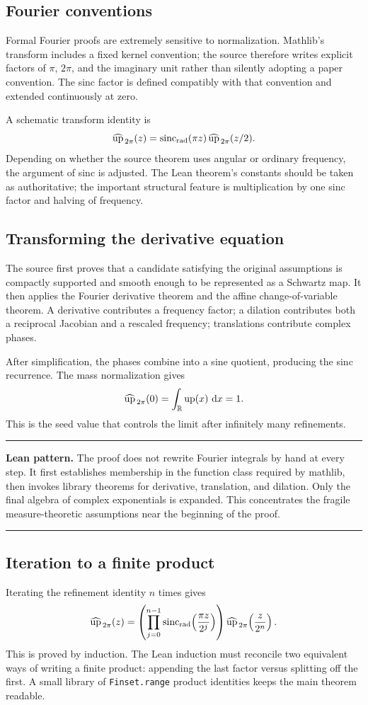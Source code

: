 \documentclass[11pt,oneside]{article}
\theoremstyle{definition}
\theoremstyle{remark}
\newenvironment{boxedremark}{%
  \par\smallskip\noindent\begin{center}\begin{minipage}{0.94\textwidth}%
  \color{black}\hrule\vspace{0.6em}\small
}{%
  \vspace{0.6em}\hrule\end{minipage}\end{center}\smallskip
}
\begin{document}
\subsection{Fourier conventions}
Formal Fourier proofs are extremely sensitive to normalization.  Mathlib's transform includes a fixed kernel convention; the source therefore writes explicit factors of \(\pi\), \(2\pi\), and the imaginary unit rather than silently adopting a paper convention.  The sinc factor is defined compatibly with that convention and extended continuously at zero.

A schematic transform identity is
\[
  \widehat{\operatorname{up}}_{\,2\pi}(z)
  =\operatorname{sinc}_{\mathrm{rad}}(\pi z)\,
   \widehat{\operatorname{up}}_{\,2\pi}(z/2).
\]
Depending on whether the source theorem uses angular or ordinary frequency, the argument of sinc is adjusted.  The Lean theorem's constants should be taken as authoritative; the important structural feature is multiplication by one sinc factor and halving of frequency.

\subsection{Transforming the derivative equation}
The source first proves that a candidate satisfying the original assumptions is compactly supported and smooth enough to be represented as a Schwartz map.  It then applies the Fourier derivative theorem and the affine change-of-variable theorem.  A derivative contributes a frequency factor; a dilation contributes both a reciprocal Jacobian and a rescaled frequency; translations contribute complex phases.

After simplification, the phases combine into a sine quotient, producing the sinc recurrence.  The mass normalization gives
\[
  \widehat{\operatorname{up}}_{\,2\pi}(0)=\int_{\mathbb{R}}\operatorname{up}(x)\,\mathop{}\!\mathrm{d} x=1.
\]
This is the seed value that controls the limit after infinitely many refinements.

\begin{boxedremark}\textbf{Lean pattern.}\space
The proof does not rewrite Fourier integrals by hand at every step.  It first establishes membership in the function class required by mathlib, then invokes library theorems for derivative, translation, and dilation.  Only the final algebra of complex exponentials is expanded.  This concentrates the fragile measure-theoretic assumptions near the beginning of the proof.
\end{boxedremark}

\subsection{Iteration to a finite product}
Iterating the refinement identity \(n\) times gives
\[
  \widehat{\operatorname{up}}_{\,2\pi}(z)
  =\left(\prod_{j=0}^{n-1}
      \operatorname{sinc}_{\mathrm{rad}}\!\left(\frac{\pi z}{2^j}\right)
    \right)
    \widehat{\operatorname{up}}_{\,2\pi}\!\left(\frac{z}{2^n}\right).
\]
This is proved by induction.  The Lean induction must reconcile two equivalent ways of writing a finite product: appending the last factor versus splitting off the first.  A small library of \nolinkurl{Finset.range} product identities keeps the main theorem readable.
\end{document}
